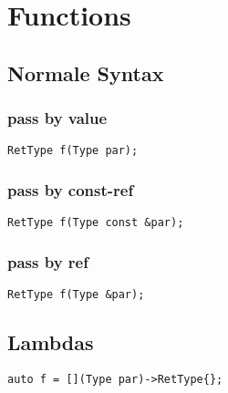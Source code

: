 \section{Functions}

\subsection{Normale Syntax}
\subsubsection{pass by value}
\begin{lstlisting}
RetType f(Type par);
\end{lstlisting}
\subsubsection{pass by const-ref}
\begin{lstlisting}
RetType f(Type const &par);
\end{lstlisting}
\subsubsection{pass by ref}
\begin{lstlisting}
RetType f(Type &par);
\end{lstlisting}

\subsection{Lambdas}
\begin{lstlisting}
auto f = [](Type par)->RetType{};
\end{lstlisting}


